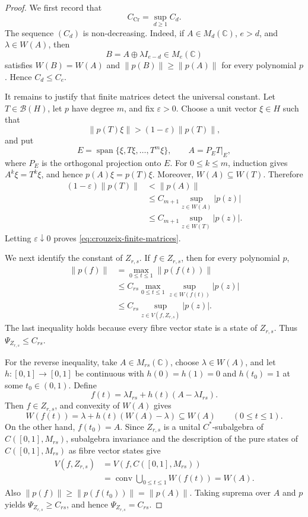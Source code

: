 \documentclass[a4paper]{amsart}
\theoremstyle{remark}
\DeclareMathOperator{\conv}{conv}
\newcommand{\C}{\mathbb C}
\newcommand{\calB}{\mathcal B}
\begin{document}
\begin{proof}
We first record that
\begin{equation}\label{eq:crouzeix-finite-matrices}
       C_{\mathrm{Cr}}=\sup_{d\geqslant1}C_d.
\end{equation}
The sequence \((C_d)\) is non-decreasing.  Indeed, if \(A\in M_d(\C)\),
\(e>d\), and \(\lambda\in W(A)\), then
\[
       B=A\oplus\lambda I_{e-d}\in M_e(\C)
\]
satisfies \(W(B)=W(A)\) and \(\|p(B)\|\geqslant\|p(A)\|\) for every
polynomial \(p\).  Hence \(C_d\leqslant C_e\).

It remains to justify that finite matrices detect the universal constant.  Let
\(T\in\calB(H)\), let \(p\) have degree \(m\), and fix \(\varepsilon>0\).
Choose a unit vector \(\xi\in H\) such that
\[
       \|p(T)\xi\|>(1-\varepsilon)\|p(T)\|,
\]
and put
\[
       E=\operatorname{span}\{\xi,T\xi,\ldots,T^m\xi\},
       \qquad A=P_ET|_E,
\]
where \(P_E\) is the orthogonal projection onto \(E\).  For
\(0\leqslant k\leqslant m\), induction gives \(A^k\xi=T^k\xi\), and hence
\(p(A)\xi=p(T)\xi\).  Moreover, \(W(A)\subseteq W(T)\).  Therefore
\[
\begin{split}
       (1-\varepsilon)\|p(T)\|
       &<\|p(A)\|\\
       &\leqslant C_{m+1}\sup_{z\in W(A)}|p(z)|\\
       &\leqslant C_{m+1}\sup_{z\in W(T)}|p(z)|.
\end{split}
\]
Letting \(\varepsilon\downarrow0\) proves \eqref{eq:crouzeix-finite-matrices}.

We next identify the constant of \(Z_{r,s}\).  If \(f\in Z_{r,s}\), then for
every polynomial \(p\),
\[
\begin{split}
       \|p(f)\|
       &=\max_{0\leqslant t\leqslant1}\|p(f(t))\|\\
       &\leqslant C_{rs}
          \max_{0\leqslant t\leqslant1}
          \sup_{z\in W(f(t))}|p(z)|\\
       &\leqslant C_{rs}\sup_{z\in V(f,Z_{r,s})}|p(z)|.
\end{split}
\]
The last inequality holds because every fibre vector state is a state of
\(Z_{r,s}\).  Thus \(\Psi_{Z_{r,s}}\leqslant C_{rs}\).

For the reverse inequality, take \(A\in M_{rs}(\C)\), choose
\(\lambda\in W(A)\), and let \(h:[0,1]\to[0,1]\) be continuous with
\(h(0)=h(1)=0\) and \(h(t_0)=1\) at some \(t_0\in(0,1)\).  Define
\[
       f(t)=\lambda I_{rs}+h(t)(A-\lambda I_{rs}).
\]
Then \(f\in Z_{r,s}\), and convexity of \(W(A)\) gives
\[
       W(f(t))=\lambda+h(t)(W(A)-\lambda)\subseteq W(A)
       \qquad(0\leqslant t\leqslant1).
\]
On the other hand, \(f(t_0)=A\).  Since \(Z_{r,s}\) is a unital
\(C^*\)-subalgebra of \(C([0,1],M_{rs})\), subalgebra invariance and the
description of the pure states of \(C([0,1],M_{rs})\) as fibre vector states
give
\[
\begin{split}
       V(f,Z_{r,s})
       &=V(f,C([0,1],M_{rs}))\\
       &=\conv\bigcup_{0\leqslant t\leqslant1}W(f(t))
        =W(A).
\end{split}
\]
Also \(\|p(f)\|\geqslant\|p(f(t_0))\|=\|p(A)\|\).  Taking suprema over
\(A\) and \(p\) yields \(\Psi_{Z_{r,s}}\geqslant C_{rs}\), and hence
\(\Psi_{Z_{r,s}}=C_{rs}\).


\end{proof}
\end{document}
